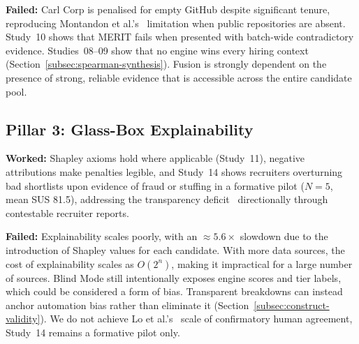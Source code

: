 \textbf{Failed:} Carl Corp is penalised for empty GitHub despite significant tenure, reproducing Montandon et al.'s~\cite{montandon2021_roles} 
limitation when public repositories are absent.
Study~10 shows that MERIT fails when presented with
batch-wide contradictory evidence. Studies~08--09 show that no engine wins every hiring context (Section~\ref{subsec:spearman-synthesis}).
Fusion is strongly dependent on the presence of strong, reliable evidence that is accessible across the entire candidate pool.

\subsection{Pillar 3: Glass-Box Explainability}

\textbf{Worked:} Shapley axioms hold where applicable (Study~11), negative attributions make penalties legible, and Study~14 shows recruiters
overturning bad shortlists upon evidence of fraud or stuffing in a formative pilot ($N=5$, mean SUS 81.5), addressing the transparency 
deficit~\cite{bogen2018,raghavan2020} directionally through contestable recruiter reports.

\textbf{Failed:} Explainability scales poorly, with an $\approx 5.6\times$ slowdown due to the introduction of Shapley values for each candidate.
With more data sources, the cost of explainability scales as $O(2^n)$, making it impractical for a large number of sources. Blind Mode still
intentionally exposes engine scores and tier labels, which could be considered a form of bias. Transparent breakdowns can instead anchor
automation bias rather than eliminate it (Section~\ref{subsec:construct-validity}).
We do not achieve Lo et al.'s~\cite{lo2025aihiring} scale of confirmatory human agreement, Study~14 remains a formative pilot only.

